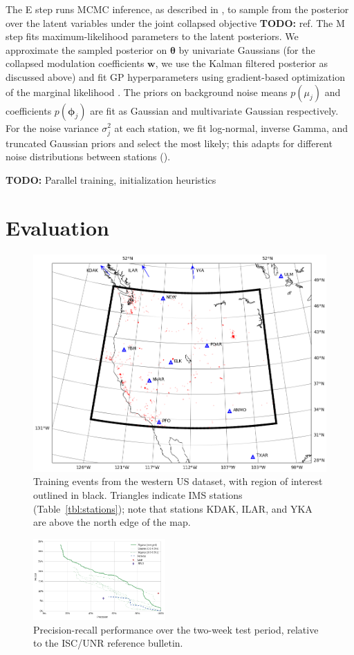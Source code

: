 \documentclass[twoside]{article} \usepackage{aistats2017}
\renewcommand{\v}[1]{\mathbf{#1}}
\newcommand{\todo}[1]{{\color{red} \textbf{TODO:} {#1}}}
\begin{document}
 The E step runs MCMC inference, as described in
 , to sample from the posterior over the latent
 variables under the joint collapsed objective \todo{ref}. The M step
 fits maximum-likelihood parameters to the latent posteriors. We
 approximate the sampled posterior on $\v{\theta}$ by univariate Gaussians (for the
 collapsed modulation coefficients $\v{w}$, we use the Kalman filtered
 posterior as discussed above) and fit GP hyperparameters using
 gradient-based optimization of the marginal likelihood
 \citep{rasmussen2006}. The priors on background noise means $p(\mu_j)$ and
 coefficients $p(\v{\phi}_j)$ are fit as Gaussian and multivariate
 Gaussian respectively. For the noise variance $\sigma^2_j$ at each
 station, we fit log-normal, inverse Gamma, and truncated Gaussian
 priors and select the most likely; this adapts for different
 noise distributions between stations ().

\todo{Parallel training, initialization heuristics}


\section{Evaluation}

\begin{figure}
\centering
\includegraphics[width=.45\textwidth]{train_stations}
\caption{Training events from the western US dataset, with region of interest outlined
  in black. Triangles indicate IMS stations
  (Table~\ref{tbl:stations}); note that stations KDAK, ILAR, and YKA
  are above the north edge of the map.}
\label{fig:iscevents}
\end{figure}


\begin{figure}
\centering
    \includegraphics[width=0.45\textwidth]{test_prec_recall}
    \caption{Precision-recall performance over the two-week test
      period, relative to the ISC/UNR reference bulletin.}
  \label{fig:test_prec_recall}
\end{figure}
\end{document}
